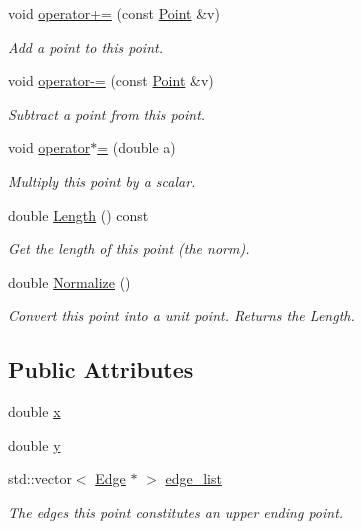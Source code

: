 \begin{DoxyCompactItemize}
void \hyperlink{structp2t_1_1_point_a114de25986403a4096c16332d388372d}{operator+=} (const \hyperlink{structp2t_1_1_point}{Point} \&v)
\begin{DoxyCompactList}\small\item\em Add a point to this point. \end{DoxyCompactList}\item 
void \hyperlink{structp2t_1_1_point_a7d22374466d39be1624a895648d1f980}{operator-\/=} (const \hyperlink{structp2t_1_1_point}{Point} \&v)
\begin{DoxyCompactList}\small\item\em Subtract a point from this point. \end{DoxyCompactList}\item 
void \hyperlink{structp2t_1_1_point_a833e141215999f1b467fbf2915240ed7}{operator$\ast$=} (double a)
\begin{DoxyCompactList}\small\item\em Multiply this point by a scalar. \end{DoxyCompactList}\item 
double \hyperlink{structp2t_1_1_point_a81ffb7fec4377c5e6a5a9b0d79143401}{Length} () const 
\begin{DoxyCompactList}\small\item\em Get the length of this point (the norm). \end{DoxyCompactList}\item 
double \hyperlink{structp2t_1_1_point_ad8add2f6f3c4a220bc5741510701f9f7}{Normalize} ()
\begin{DoxyCompactList}\small\item\em Convert this point into a unit point. Returns the Length. \end{DoxyCompactList}\end{DoxyCompactItemize}
\subsection*{Public Attributes}
\begin{DoxyCompactItemize}
\item 
double \hyperlink{structp2t_1_1_point_a49ca18e331005473fabe8352ae30aa87}{x}
\item 
double \hyperlink{structp2t_1_1_point_ac145d2fc2a314ba5d1f5f93b32888313}{y}
\item 
std\+::vector$<$ \hyperlink{structp2t_1_1_edge}{Edge} $\ast$ $>$ \hyperlink{structp2t_1_1_point_a116c82146cc0bf573baac56c77a9f90a}{edge\+\_\+list}
\begin{DoxyCompactList}\small\item\em The edges this point constitutes an upper ending point. \end{DoxyCompactList}\end{DoxyCompactItemize}


